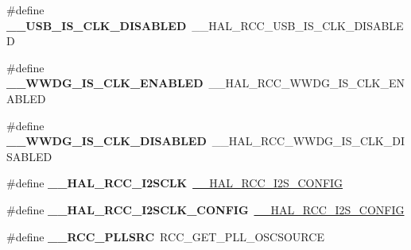 \begin{DoxyCompactItemize}
\item 
\mbox{\label{group___h_a_l___r_c_c___aliased_ga85b0605d36fd5aa803d746eca015176f}} 
\#define {\bfseries \+\_\+\+\_\+\+U\+S\+B\+\_\+\+I\+S\+\_\+\+C\+L\+K\+\_\+\+D\+I\+S\+A\+B\+L\+ED}~\+\_\+\+\_\+\+H\+A\+L\+\_\+\+R\+C\+C\+\_\+\+U\+S\+B\+\_\+\+I\+S\+\_\+\+C\+L\+K\+\_\+\+D\+I\+S\+A\+B\+L\+ED
\item 
\mbox{\label{group___h_a_l___r_c_c___aliased_gabf1f0e44cf619dc56ee9cf091be090f6}} 
\#define {\bfseries \+\_\+\+\_\+\+W\+W\+D\+G\+\_\+\+I\+S\+\_\+\+C\+L\+K\+\_\+\+E\+N\+A\+B\+L\+ED}~\+\_\+\+\_\+\+H\+A\+L\+\_\+\+R\+C\+C\+\_\+\+W\+W\+D\+G\+\_\+\+I\+S\+\_\+\+C\+L\+K\+\_\+\+E\+N\+A\+B\+L\+ED
\item 
\mbox{\label{group___h_a_l___r_c_c___aliased_ga15d27ad70f9cc20c8a51b4e9eab77349}} 
\#define {\bfseries \+\_\+\+\_\+\+W\+W\+D\+G\+\_\+\+I\+S\+\_\+\+C\+L\+K\+\_\+\+D\+I\+S\+A\+B\+L\+ED}~\+\_\+\+\_\+\+H\+A\+L\+\_\+\+R\+C\+C\+\_\+\+W\+W\+D\+G\+\_\+\+I\+S\+\_\+\+C\+L\+K\+\_\+\+D\+I\+S\+A\+B\+L\+ED
\item 
\mbox{\label{group___h_a_l___r_c_c___aliased_ga6b96f4a2f2c7dc9219b24883e8bea223}} 
\#define {\bfseries \+\_\+\+\_\+\+H\+A\+L\+\_\+\+R\+C\+C\+\_\+\+I2\+S\+C\+LK}~\mbox{\hyperlink{group___r_c_c___p_l_l___i2_s___configuration_ga3927ddd738bac3fe4d99a277e1d5830f}{\+\_\+\+\_\+\+H\+A\+L\+\_\+\+R\+C\+C\+\_\+\+I2\+S\+\_\+\+C\+O\+N\+F\+IG}}
\item 
\mbox{\label{group___h_a_l___r_c_c___aliased_gadc772f9067a6f4591305fe7dc0603447}} 
\#define {\bfseries \+\_\+\+\_\+\+H\+A\+L\+\_\+\+R\+C\+C\+\_\+\+I2\+S\+C\+L\+K\+\_\+\+C\+O\+N\+F\+IG}~\mbox{\hyperlink{group___r_c_c___p_l_l___i2_s___configuration_ga3927ddd738bac3fe4d99a277e1d5830f}{\+\_\+\+\_\+\+H\+A\+L\+\_\+\+R\+C\+C\+\_\+\+I2\+S\+\_\+\+C\+O\+N\+F\+IG}}
\item 
\mbox{\label{group___h_a_l___r_c_c___aliased_ga181e9fea5e2a50d09d2b32f5ebf78794}} 
\#define {\bfseries \+\_\+\+\_\+\+R\+C\+C\+\_\+\+P\+L\+L\+S\+RC}~R\+C\+C\+\_\+\+G\+E\+T\+\_\+\+P\+L\+L\+\_\+\+O\+S\+C\+S\+O\+U\+R\+CE
\item 
\mbox{\label{group___h_a_l___r_c_c___aliased_gad3f63ae7a859b8f5395aaf703ac72694}} 

\end{DoxyCompactItemize}
